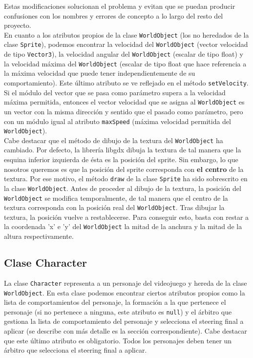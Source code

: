 Estas modificaciones solucionan el problema y evitan que se puedan producir confusiones con los nombres y errores de concepto a lo largo del resto del proyecto. \\

En cuanto a los atributos propios de la clase \texttt{WorldObject} (los no heredados de la clase \texttt{Sprite}), podemos encontrar la velocidad del \texttt{WorldObject} (vector velocidad de tipo \texttt{Vector3}), la velocidad angular del \texttt{WorldObject} (escalar de tipo float) y la velocidad máxima del \texttt{WorldObject} (escalar de tipo float que hace referencia a la máxima velocidad que puede tener independientemente de su comportamiento). Este último atributo se ve reflejado en el método \texttt{setVelocity}. Si el módulo del vector que se pasa como parámetro supera a la velocidad máxima permitida, entonces el vector velocidad que se asigna al \texttt{WorldObject} es un vector con la misma dirección y sentido que el pasado como parámetro, pero con un módulo igual al atributo \texttt{maxSpeed} (máxima velocidad permitida del \texttt{WorldObject}). \\

Cabe destacar que el método de dibujo de la textura del \texttt{WorldObject} ha cambiado. Por defecto, la librería libgdx dibuja la textura de tal manera que la esquina inferior izquierda de ésta es la posición del sprite. Sin embargo, lo que nosotros queremos es que la posición del sprite corresponda con \textbf{el centro} de la textura. Por ese motivo, el método \texttt{draw} de la clase \texttt{Sprite} ha sido sobrescrito en la clase \texttt{WorldObject}. Antes de proceder al dibujo de la textura, la posición del \texttt{WorldObject} se modifica temporalmente, de tal manera que el centro de la textura corresponda con la posición real del \texttt{WorldObject}. Tras dibujar la textura, la posición vuelve a restablecerse. Para conseguir esto, basta con restar a la coordenada 'x' e 'y' del \texttt{WorldObject} la mitad de la anchura y la mitad de la altura respectivamente.


\subsection{Clase Character}
\label{clase-personaje}

La clase \texttt{Character} representa a un personaje del videojuego y hereda de la clase \texttt{WorldObject}. En esta clase podemos encontrar ciertos atributos propios como la lista de comportamientos del personaje, la formación a la que pertenece el personaje (si no pertenece a ninguna, este atributo es \texttt{null}) y el árbitro que gestiona la lista de comportamiento del personaje y selecciona el steering final a aplicar (se describe con más detalle es la sección correspondiente). Cabe destacar que este último atributo es obligatorio. Todos los personajes deben tener un árbitro que selecciona el steering final a aplicar. \\

